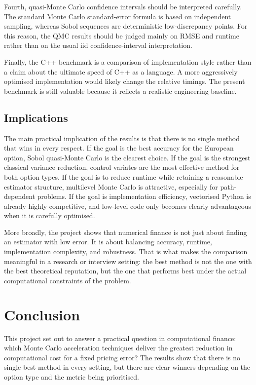 \documentclass[11pt]{article}
\begin{document}
Fourth, quasi-Monte Carlo confidence intervals should be interpreted carefully. The standard Monte Carlo standard-error formula is based on independent sampling, whereas Sobol sequences are deterministic low-discrepancy points. For this reason, the QMC results should be judged mainly on RMSE and runtime rather than on the usual iid confidence-interval interpretation.

Finally, the C++ benchmark is a comparison of implementation style rather than a claim about the ultimate speed of C++ as a language. A more aggressively optimised implementation would likely change the relative timings. The present benchmark is still valuable because it reflects a realistic engineering baseline.

\subsection{Implications}

The main practical implication of the results is that there is no single method that wins in every respect. If the goal is the best accuracy for the European option, Sobol quasi-Monte Carlo is the clearest choice. If the goal is the strongest classical variance reduction, control variates are the most effective method for both option types. If the goal is to reduce runtime while retaining a reasonable estimator structure, multilevel Monte Carlo is attractive, especially for path-dependent problems. If the goal is implementation efficiency, vectorised Python is already highly competitive, and low-level code only becomes clearly advantageous when it is carefully optimised.

More broadly, the project shows that numerical finance is not just about finding an estimator with low error. It is about balancing accuracy, runtime, implementation complexity, and robustness. That is what makes the comparison meaningful in a research or interview setting: the best method is not the one with the best theoretical reputation, but the one that performs best under the actual computational constraints of the problem.


\section{Conclusion}

This project set out to answer a practical question in computational finance: which Monte Carlo acceleration techniques deliver the greatest reduction in computational cost for a fixed pricing error? The results show that there is no single best method in every setting, but there are clear winners depending on the option type and the metric being prioritised.
\end{document}
